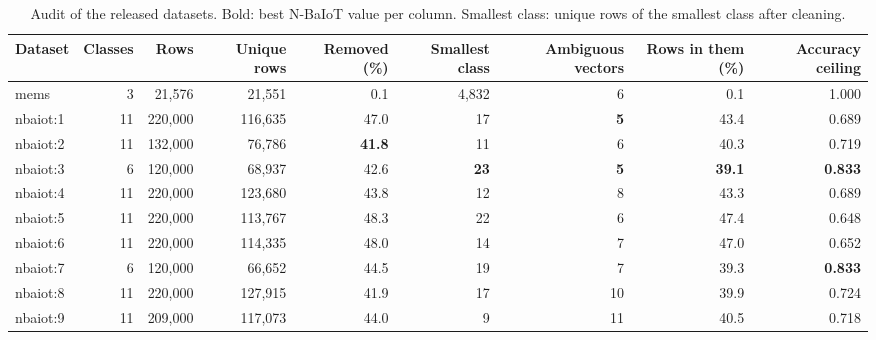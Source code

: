 \begin{table}[t]
\centering
\caption{Audit of the released datasets. Bold: best N-BaIoT value per column. Smallest class: unique rows of the smallest class after cleaning.}
\label{tab:audit}
\scriptsize
\setlength{\tabcolsep}{3pt}
\begin{tabular}{@{}lrrrrrrrr@{}}
\toprule
Dataset & Classes & Rows & Unique rows & Removed (\%) & Smallest class & Ambiguous vectors & Rows in them (\%) & Accuracy ceiling \\
\midrule
mems & 3 & 21,576 & 21,551 & 0.1 & 4,832 & 6 & 0.1 & 1.000 \\
\midrule
nbaiot:1 & 11 & 220,000 & 116,635 & 47.0 & 17 & \textbf{5} & 43.4 & 0.689 \\
nbaiot:2 & 11 & 132,000 & 76,786 & \textbf{41.8} & 11 & 6 & 40.3 & 0.719 \\
nbaiot:3 & 6 & 120,000 & 68,937 & 42.6 & \textbf{23} & \textbf{5} & \textbf{39.1} & \textbf{0.833} \\
nbaiot:4 & 11 & 220,000 & 123,680 & 43.8 & 12 & 8 & 43.3 & 0.689 \\
nbaiot:5 & 11 & 220,000 & 113,767 & 48.3 & 22 & 6 & 47.4 & 0.648 \\
nbaiot:6 & 11 & 220,000 & 114,335 & 48.0 & 14 & 7 & 47.0 & 0.652 \\
nbaiot:7 & 6 & 120,000 & 66,652 & 44.5 & 19 & 7 & 39.3 & \textbf{0.833} \\
nbaiot:8 & 11 & 220,000 & 127,915 & 41.9 & 17 & 10 & 39.9 & 0.724 \\
nbaiot:9 & 11 & 209,000 & 117,073 & 44.0 & 9 & 11 & 40.5 & 0.718 \\
\bottomrule
\end{tabular}
\end{table}
